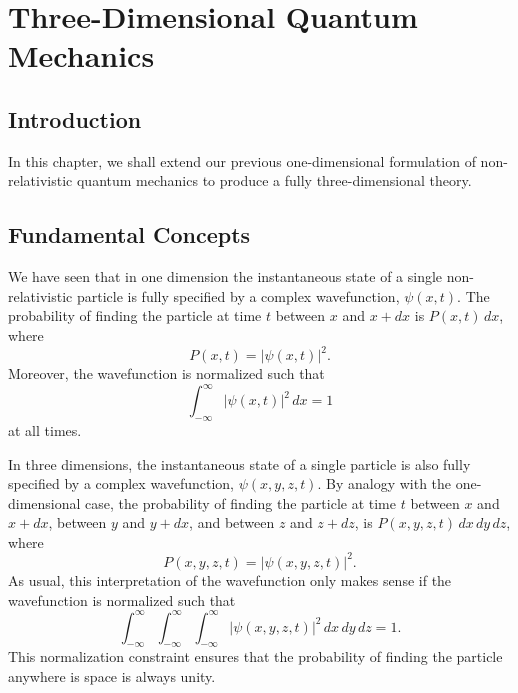  \chapter{Three-Dimensional Quantum Mechanics}\label{sthree}
 \section{Introduction}
In this chapter, we shall extend our previous one-dimensional formulation
of non-relativistic quantum mechanics to produce a fully three-dimensional theory.

\section{Fundamental Concepts}\label{s7.2}
We have  seen that in one dimension the instantaneous state
of a single non-relativistic particle is fully specified by a complex wavefunction,
$\psi(x,t)$. The probability
of finding the particle at time $t$ between $x$ and $x+dx$ is
$P(x,t)\,dx$, where
\begin{equation}
P(x,t) = |\psi(x,t)|^2.
\end{equation}
Moreover, the wavefunction is
normalized such that
\begin{equation}
\int_{-\infty}^\infty |\psi(x,t)|^2\,dx = 1
\end{equation}
at all times.

In three dimensions, the instantaneous state of a single particle is also
fully specified by a complex wavefunction, $\psi(x,y,z,t)$.
By analogy with the one-dimensional case, the probability of finding
the particle at time $t$ between $x$ and $x+dx$, between $y$ and $y+dx$, and between
$z$ and $z+dz$, is $P(x,y,z,t)\,dx\,dy\,dz$, where
\begin{equation}
P(x,y,z,t) = |\psi(x,y,z,t)|^2.
\end{equation}
As usual, this interpretation of the wavefunction only makes sense if the
wavefunction is normalized such that
\begin{equation}
\int_{-\infty}^\infty\int_{-\infty}^\infty\int_{-\infty}^\infty |\psi(x,y,z,t)|^2\,dx\,dy\,dz = 1.
\end{equation}
This normalization constraint ensures that the probability of finding the particle anywhere is space is always unity.


